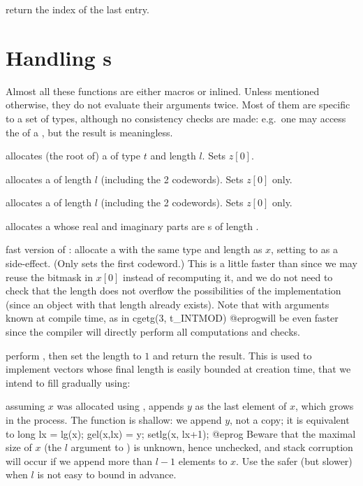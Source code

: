  return the index of the last entry.

\section{Handling s}
\noindent Almost all these functions are either macros or inlined. Unless
mentioned otherwise, they do not evaluate their arguments twice. Most of them
are specific to a set of types, although no consistency checks are made:
e.g.~one may access the  of a , but the result is
meaningless.


 allocates (the root of) a 
of type $t$ and length $l$. Sets $z[0]$.

 allocates a  of length $l$ (including the
2 codewords). Sets $z[0]$ only.

 allocates a  of length $l$ (including the
2 codewords). Sets $z[0]$ only.

 allocates a  whose real and
imaginary parts are s of length .

 fast version of :
allocate a  with the same type and length as $x$, setting 
to  as a side-effect. (Only sets the first codeword.) This is
a little faster than  since we may reuse the bitmask in
$x[0]$ instead of recomputing it, and we do not need to check that the
length does not overflow the possibilities of the
implementation (since an object with that length already exists). Note that
 with arguments known at compile time, as in
\bprog
  cgetg(3, t_INTMOD)
@eprog\noindent will be even faster since the compiler will directly perform
all computations and checks.

 perform , then
set the length to $1$ and return the result. This is used to  implement
vectors whose final length is easily bounded at creation time, that we intend
to fill gradually using:

 assuming $x$ was allocated using
, appends $y$ as the last element of $x$, which
grows in the process. The function is shallow: we append $y$, not a copy;
it is equivalent to
\bprog
  long lx = lg(x); gel(x,lx) = y; setlg(x, lx+1);
@eprog\noindent
Beware that the maximal size of $x$ (the $l$ argument to )
is unknown, hence unchecked, and stack corruption will occur if we append
more than $l-1$ elements to $x$. Use the safer (but slower)
 when $l$ is not easy to bound in advance.

